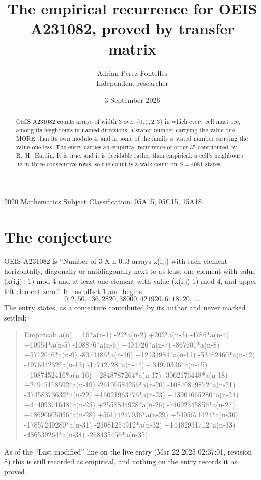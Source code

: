 \documentclass[11pt,a4paper]{article}
\title{The empirical recurrence for OEIS A231082, proved by transfer matrix}
\author{Adrian Perez Fontelles\\ \small Independent researcher}
\date{3 September 2026}
\theoremstyle{plain}
\theoremstyle{definition}
\begin{document}
\maketitle

\begin{abstract}
OEIS A231082 counts arrays of width $3$ over $\{0,1,2,3\}$ in which every cell must see, among its
neighbours in named directions, a stated number carrying the value one MORE than its own
modulo $4$, and in some of the family a stated number carrying the value one less. The entry
carries an empirical recurrence of order $35$ contributed by R.~H.~Hardin. It is true, and
it is decidable rather than empirical: a cell's neighbours lie in three consecutive rows, so
the count is a walk count on $S=4081$ states.
\end{abstract}

\noindent\small 2020 Mathematics Subject Classification. 05A15, 05C15, 15A18.\normalsize

\section{The conjecture}

OEIS A231082 is ``Number of 3 X n 0..3 arrays x(i,j) with each element horizontally, diagonally or antidiagonally next to at least one element with value (x(i,j)+1) mod 4 and at least one element with value (x(i,j)-1) mod 4, and upper left element zero.''. It has offset $1$ and begins
\[
0, 2, 50, 136, 2820, 38000, 421920, 6118120,\ \dots
\]
The entry states, as a conjecture contributed by its author and never marked settled:
\begin{quote}
Empirical: a(n) = 16*a(n-1) -22*a(n-2) +202*a(n-3) -4786*a(n-4) +10954*a(n-5) -108876*a(n-6) +494726*a(n-7) -867601*a(n-8) +5712046*a(n-9) -8074486*a(n-10) +12131984*a(n-11) -53462460*a(n-12) -197644232*a(n-13) -17742728*a(n-14) -134970336*a(n-15) +1087452416*a(n-16) +2848787264*a(n-17) -3062176448*a(n-18) +24945118592*a(n-19) -26105584256*a(n-20) -10840879872*a(n-21) -37458373632*a(n-22) +16021963776*a(n-23) +13901665280*a(n-24) +34409371648*a(n-25) +2558844928*a(n-26) -74692345856*a(n-27) +18690605056*a(n-28) +56174247936*a(n-29) +5405671424*a(n-30) -17857249280*a(n-31) -23081254912*a(n-32) +14482931712*a(n-33) -486539264*a(n-34) -268435456*a(n-35)
\end{quote}
As of the ``Last modified'' line on the live entry (Mar 22 2025 02:37:01, revision 8) this is still
recorded as empirical, and nothing on the entry records it as proved.
\end{document}
